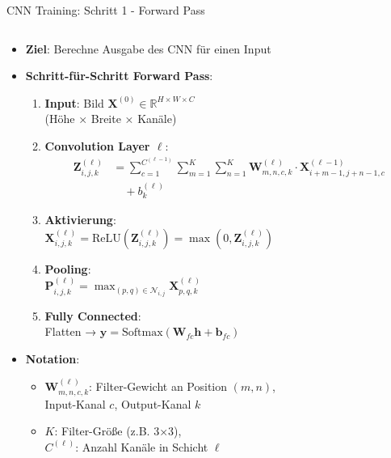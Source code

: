\documentclass[aspectratio=1610, xcolor=dvipsnames, 9pt]{beamer}
\begin{document}
      \begin{frame}{CNN Training: Schritt 1 - Forward Pass}
        \begin{columns}
          \begin{column}{1\textwidth}
            \begin{itemize}
              \item \textbf{Ziel}: Berechne Ausgabe des CNN für einen Input
              \item \textbf{Schritt-für-Schritt Forward Pass}:
              \begin{enumerate}
                \item \textbf{Input}: Bild $\mathbf{X}^{(0)} \in \mathbb{R}^{H \times W \times C}$ \\
                      (Höhe × Breite × Kanäle)
                \item \textbf{Convolution Layer $\ell$}:
                \begin{align}
                  \mathbf{Z}^{(\ell)}_{i,j,k} &= \sum_{c=1}^{C^{(\ell-1)}} \sum_{m=1}^{K} \sum_{n=1}^{K} \mathbf{W}^{(\ell)}_{m,n,c,k} \cdot \mathbf{X}^{(\ell-1)}_{i+m-1,j+n-1,c} \\
                  &\quad + b^{(\ell)}_k
                \end{align}
                \item \textbf{Aktivierung}: \\
                      $\mathbf{X}^{(\ell)}_{i,j,k} = \text{ReLU}(\mathbf{Z}^{(\ell)}_{i,j,k}) = \max(0, \mathbf{Z}^{(\ell)}_{i,j,k})$
                \item \textbf{Pooling}: \\
                      $\mathbf{P}^{(\ell)}_{i,j,k} = \max_{(p,q) \in \mathcal{N}_{i,j}} \mathbf{X}^{(\ell)}_{p,q,k}$
                \item \textbf{Fully Connected}: \\
                      Flatten → $\mathbf{y} = \text{Softmax}(\mathbf{W}_{fc} \mathbf{h} + \mathbf{b}_{fc})$
              \end{enumerate}
              \item \textbf{Notation}:
              \begin{itemize}
                \item $\mathbf{W}^{(\ell)}_{m,n,c,k}$: Filter-Gewicht an Position $(m,n)$, \\
                      Input-Kanal $c$, Output-Kanal $k$
                \item $K$: Filter-Größe (z.B. 3×3), \\
                      $C^{(\ell)}$: Anzahl Kanäle in Schicht $\ell$
              \end{itemize}
            \end{itemize}
          \end{column}
        \end{columns}
      \end{frame}
\end{document}
